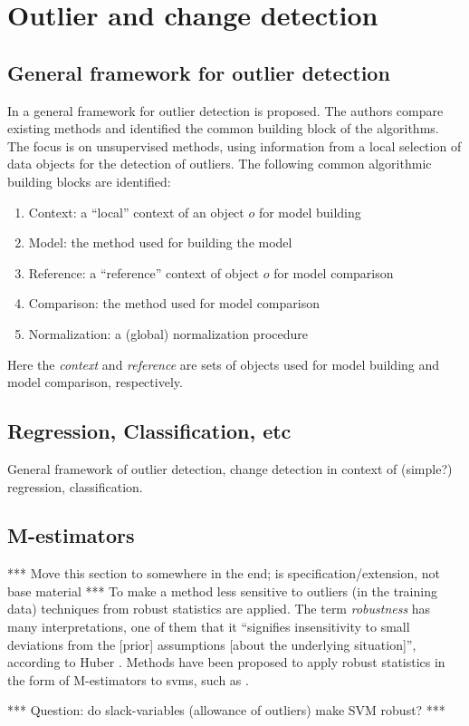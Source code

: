 \section{Outlier and change detection}\label{sec:outlier_detection}

\subsection{General framework for outlier detection}
In \cite{schubert2012local} a general framework for outlier detection is proposed.
The authors compare existing methods and identified the common building block of the algorithms.
The focus is on unsupervised methods, using information from a local selection of data objects for the detection of outliers.
The following common algorithmic building blocks are identified:

\begin{enumerate}
  \item Context: a ``local'' context of an object $o$ for model building
  \item Model: the method used for building the model
  \item Reference: a ``reference'' context of object $o$ for model comparison
  \item Comparison: the method used for model comparison
  \item Normalization: a (global) normalization procedure
\end{enumerate}

Here the \emph{context} and \emph{reference} are sets of objects used for model building and model comparison, respectively.


\subsection{Regression, Classification, etc}

General framework of outlier detection, change detection in context of (simple?) regression, classification.

\subsection{M-estimators}
*** Move this section to somewhere in the end; is specification/extension, not base material ***
To make a method less sensitive to outliers (in the training data) techniques from robust statistics are applied.
The term \emph{robustness} has many interpretations, one of them that it ``signifies insensi­tivity to small deviations from the [prior] assumptions [about the underlying situation]'', according to Huber \cite{huber2009robust}.
Methods have been proposed to apply robust statistics in the form of M-estimators to \glspl{svm}, such as \cite{choi2009least,chen2004m,suykens1999least}.

*** Question: do slack-variables (allowance of outliers) make SVM robust? ***